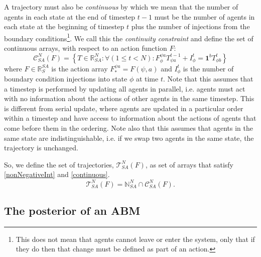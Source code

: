 \documentclass{article}
\begin{document}
A trajectory must also be \textit{continuous} by which we mean that the number of agents in each state at the end of timestep $t-1$ must be the number of agents in each state at the beginning of timestep $t$ plus the number of injections from the boundary conditions\footnote{This does not mean that agents cannot leave or enter the system, only that if they do then that change must be defined as part of an action.}. We call this the \textit{continuity constraint} and define the set of continuous arrays, with respect to an action function $F$:
\begin{equation}
\mathcal{C}^N_{SA}(F) = \left\{T\in\mathbb{R}^N_{SA}:  \forall \left(  1 \le t < N\right): F^{\psi a}_{\phi} T^{t-1}_{\psi a} + I^t_\phi = \mathbf{1}^bT^{t}_{\phi b} \right\}
\label{continuous}
\end{equation}
where $F \in \mathbb{R}^{SA}_S$ is the action array $F^{\psi a}_* = F(\psi, a)$ and $I^t_\phi$ is the number of boundary condition injections into state $\phi$ at time $t$. Note that this assumes that a timestep is performed by updating all agents in parallel, i.e. agents must act with no information about the actions of other agents in the same timestep. This is different from serial update, where agents are updated in a particular order within a timestep and have access to information about the actions of agents that come before them in the ordering. Note also that this assumes that agents in the same state are indistinguishable, i.e. if we swap two agents in the same state, the trajectory is unchanged.


So, we define the set of trajectories, $\mathcal{T}^N_{SA}(F)$, as set of arrays that satisfy \eqref{nonNegativeInt} and \eqref{continuous}.
\begin{equation}
\mathcal{T}^N_{SA}(F) = \mathbb{N}^N_{SA} \cap \mathcal{C}^N_{SA}(F).
\label{SetOfTrajectories}
\end{equation}


\subsection{The posterior of an ABM}
\end{document}
